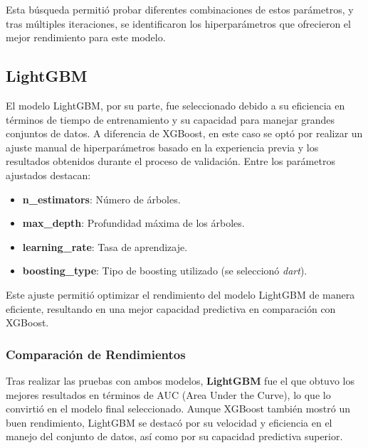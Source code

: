 \documentclass[a4paper,11pt]{article}
\begin{document}
Esta búsqueda permitió probar diferentes combinaciones de estos parámetros, y tras múltiples iteraciones, se identificaron los hiperparámetros que ofrecieron el mejor rendimiento para este modelo.

\subsection{LightGBM}

El modelo LightGBM, por su parte, fue seleccionado debido a su eficiencia en términos de tiempo de entrenamiento y su capacidad para manejar grandes conjuntos de datos. A diferencia de XGBoost, en este caso se optó por realizar un ajuste manual de hiperparámetros basado en la experiencia previa y los resultados obtenidos durante el proceso de validación. Entre los parámetros ajustados destacan:

\begin{itemize}
    \item \textbf{n\_estimators}: Número de árboles.
    \item \textbf{max\_depth}: Profundidad máxima de los árboles.
    \item \textbf{learning\_rate}: Tasa de aprendizaje.
    \item \textbf{boosting\_type}: Tipo de boosting utilizado (se seleccionó \textit{dart}).
\end{itemize}

Este ajuste permitió optimizar el rendimiento del modelo LightGBM de manera eficiente, resultando en una mejor capacidad predictiva en comparación con XGBoost.

\subsubsection{Comparación de Rendimientos}

Tras realizar las pruebas con ambos modelos, \textbf{LightGBM} fue el que obtuvo los mejores resultados en términos de AUC (Area Under the Curve), lo que lo convirtió en el modelo final seleccionado. Aunque XGBoost también mostró un buen rendimiento, LightGBM se destacó por su velocidad y eficiencia en el manejo del conjunto de datos, así como por su capacidad predictiva superior.


    
\end{document}
